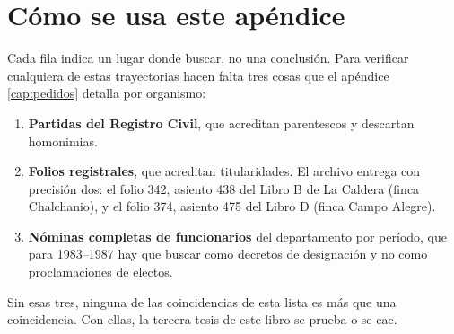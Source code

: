 \section*{Cómo se usa este apéndice}

Cada fila indica un lugar donde buscar, no una conclusión. Para verificar cualquiera de estas
trayectorias hacen falta tres cosas que el apéndice \ref{cap:pedidos} detalla por organismo:

\begin{enumerate}[leftmargin=*]
\item \textbf{Partidas del Registro Civil}, que acreditan parentescos y descartan homonimias.
\item \textbf{Folios registrales}, que acreditan titularidades. El archivo entrega con precisión dos: el folio 342, asiento 438 del Libro B de La Caldera (finca Chalchanio), y el folio 374, asiento 475 del Libro D (finca Campo Alegre).
\item \textbf{Nóminas completas de funcionarios} del departamento por período, que para
1983--1987 hay que buscar como decretos de designación y no como proclamaciones de electos.
\end{enumerate}

Sin esas tres, ninguna de las coincidencias de esta lista es más que una coincidencia. Con
ellas, la tercera tesis de este libro se prueba o se cae.
